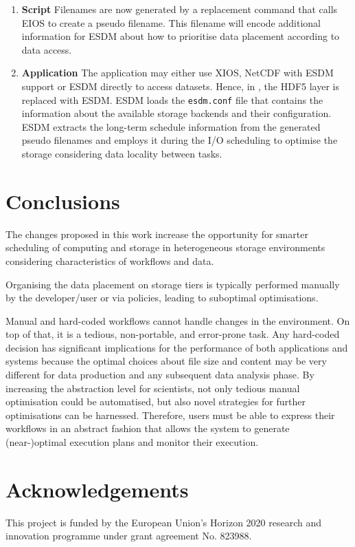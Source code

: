 \documentclass{superfri}
\begin{document}
\begin{enumerate}
  \item \textbf{Script}
  Filenames are now generated by a replacement command that calls EIOS to create a pseudo filename.
  This filename will encode additional information for ESDM about how to prioritise data placement according to data access.

  \item \textbf{Application}
  The application may either use XIOS, NetCDF with ESDM support or ESDM directly to access datasets.
  Hence, in , the HDF5 layer is replaced with ESDM.
  ESDM loads the \texttt{esdm.conf} file that contains the information about the available storage backends and their configuration.
  ESDM extracts the long-term schedule information from the generated pseudo filenames and employs it during the I/O scheduling to optimise the storage considering data locality between tasks.

\end{enumerate}

\section{Conclusions}
\label{sec:conclusions}

The changes proposed in this work increase the opportunity for smarter scheduling of computing and storage in heterogeneous storage environments considering characteristics of workflows and data.

Organising the data placement on storage tiers is typically performed manually by the developer/user or via policies, leading to suboptimal optimisations.

Manual and hard-coded workflows cannot handle changes in the environment. On top of that, it is a tedious, non-portable, and error-prone task.
Any hard-coded decision has significant implications for the performance of both applications and systems because the optimal choices about file size and content may be very different for data production and any subsequent data analysis phase.
By increasing the abstraction level for scientists, not only tedious manual optimisation could be automatised, but also novel strategies for further optimisations can be harnessed.
Therefore, users must be able to express their workflows in an abstract fashion that allows the system to generate (near-)optimal execution plans and monitor their execution.

\section*{Acknowledgements}

\small
This project is funded by the European Union's Horizon 2020 research and innovation programme under grant agreement No. 823988.

\openaccess


\end{document}
